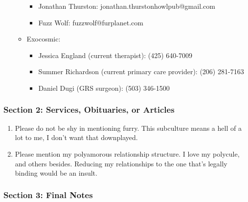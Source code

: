 \begin{enumerate}
\begin{itemize}
    \begin{itemize}
    \tightlist
    \item
      Jonathan Thurston: jonathan.thurstonhowlpub@gmail.com
    \item
      Fuzz Wolf: fuzzwolf@furplanet.com
    \end{itemize}
  \item
    Exocosmic:

    \begin{itemize}
    \tightlist
    \item
      Jessica England (current therapist): (425) 640-7009
    \item
      Summer Richardson (current primary care provider): (206) 281-7163
    \item
      Daniel Dugi (GRS surgeon): (503) 346-1500
    \end{itemize}
  \end{itemize}
\end{enumerate}

\hypertarget{section-2-services-obituaries-or-articles}{%
\subsubsection*{Section 2: Services, Obituaries, or Articles}\label{section-2-services-obituaries-or-articles}}

\begin{enumerate}
\def\labelenumi{\arabic{enumi}.}
\tightlist
\item
  Please do not be shy in mentioning furry. This subculture means a hell of a lot to me, I don't want that downplayed.
\item
  Please mention my polyamorous relationship structure. I love my polycule, and others besides. Reducing my relationships to the one that's legally binding would be an insult.
\end{enumerate}

\hypertarget{section-3-final-notes}{%
\subsubsection*{Section 3: Final Notes}\label{section-3-final-notes}}

